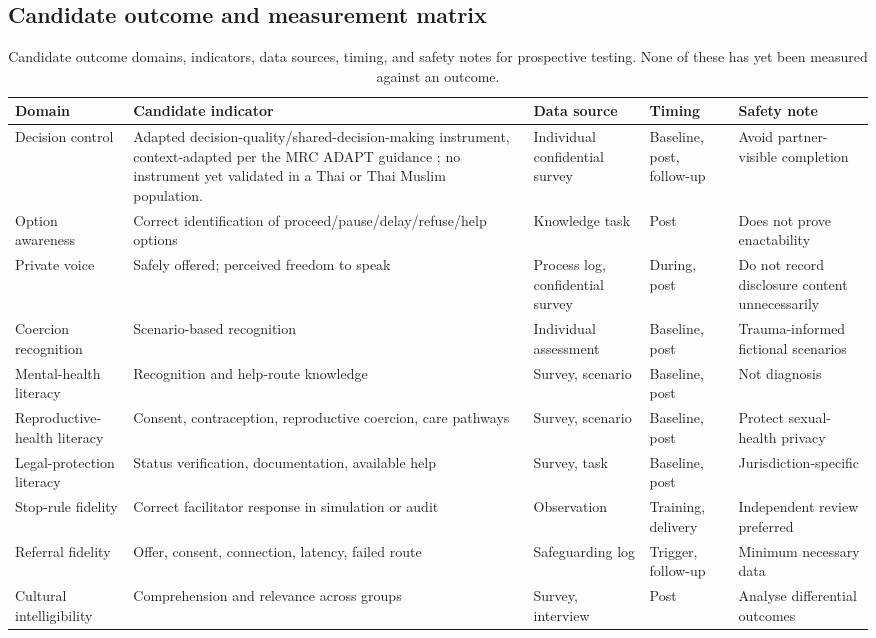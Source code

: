 \documentclass[11pt]{article}
\begin{document}
\subsection{Candidate outcome and measurement matrix}
\begin{table}[H]
\centering\footnotesize
\caption{Candidate outcome domains, indicators, data sources, timing, and safety notes for prospective testing. None of these has yet been measured against an outcome.}
\label{tab:S3a}
\begin{tabularx}{\textwidth}{@{}p{3cm}YYp{2.2cm}Y@{}}
\toprule
\textbf{Domain} & \textbf{Candidate indicator} & \textbf{Data source} & \textbf{Timing} & \textbf{Safety note}\\
\midrule
Decision control & Adapted decision-quality\slash shared-decision-making instrument, context-adapted per the MRC ADAPT guidance \cite{ref53}; no instrument yet validated in a Thai or Thai Muslim population. & Individual confidential survey & Baseline, post, follow-up & Avoid partner-visible completion\\
Option awareness & Correct identification of proceed\slash pause\slash delay\slash refuse\slash help options & Knowledge task & Post & Does not prove enactability\\
Private voice & Safely offered; perceived freedom to speak & Process log, confidential survey & During, post & Do not record disclosure content unnecessarily\\
Coercion recognition & Scenario-based recognition & Individual assessment & Baseline, post & Trauma-informed fictional scenarios\\
Mental-health literacy & Recognition and help-route knowledge & Survey, scenario & Baseline, post & Not diagnosis\\
Reproductive-health literacy & Consent, contraception, reproductive coercion, care pathways & Survey, scenario & Baseline, post & Protect sexual-health privacy\\
Legal-protection literacy & Status verification, documentation, available help & Survey, task & Baseline, post & Jurisdiction-specific\\
Stop-rule fidelity & Correct facilitator response in simulation or audit & Observation & Training, delivery & Independent review preferred\\
Referral fidelity & Offer, consent, connection, latency, failed route & Safeguarding log & Trigger, follow-up & Minimum necessary data\\
Cultural intelligibility & Comprehension and relevance across groups & Survey, interview & Post & Analyse differential outcomes\\

\end{tabularx}
\end{table}
\end{document}
